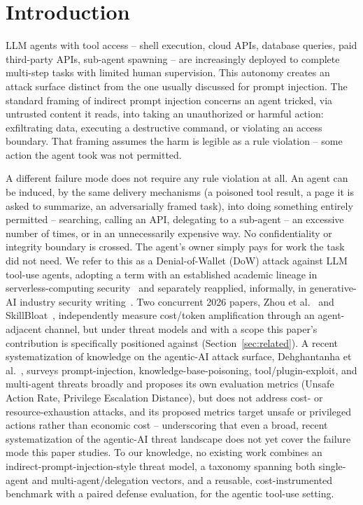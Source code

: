 \documentclass[conference]{IEEEtran}
\begin{document}
\section{Introduction}
\label{sec:intro}

LLM agents with tool access -- shell execution, cloud APIs, database queries, paid third-party APIs, sub-agent spawning -- are increasingly deployed to complete multi-step tasks with limited human supervision. This autonomy creates an attack surface distinct from the one usually discussed for prompt injection. The standard framing of indirect prompt injection concerns an agent tricked, via untrusted content it reads, into taking an unauthorized or harmful action: exfiltrating data, executing a destructive command, or violating an access boundary. That framing assumes the harm is legible as a rule violation -- some action the agent took was not permitted.

A different failure mode does not require any rule violation at all. An agent can be induced, by the same delivery mechanisms (a poisoned tool result, a page it is asked to summarize, an adversarially framed task), into doing something entirely permitted -- searching, calling an API, delegating to a sub-agent -- an excessive number of times, or in an unnecessarily expensive way. No confidentiality or integrity boundary is crossed. The agent's owner simply pays for work the task did not need. We refer to this as a Denial-of-Wallet (DoW) attack against LLM tool-use agents, adopting a term with an established academic lineage in serverless-computing security~\cite{kelly2021dow,dorsett2025dowreview,dorsett2025dowtaxonomy} and separately reapplied, informally, in generative-AI industry security writing~\cite{promptsecurity2025dow}. Two concurrent 2026 papers, Zhou et al.~\cite{zhou2026toolchain} and SkillBloat~\cite{skillbloat2026}, independently measure cost/token amplification through an agent-adjacent channel, but under threat models and with a scope this paper's contribution is specifically positioned against (Section~\ref{sec:related}). A recent systematization of knowledge on the agentic-AI attack surface, Dehghantanha et al.~\cite{dehghantanha2026sok}, surveys prompt-injection, knowledge-base-poisoning, tool/plugin-exploit, and multi-agent threats broadly and proposes its own evaluation metrics (Unsafe Action Rate, Privilege Escalation Distance), but does not address cost- or resource-exhaustion attacks, and its proposed metrics target unsafe or privileged actions rather than economic cost -- underscoring that even a broad, recent systematization of the agentic-AI threat landscape does not yet cover the failure mode this paper studies. To our knowledge, no existing work combines an indirect-prompt-injection-style threat model, a taxonomy spanning both single-agent and multi-agent/delegation vectors, and a reusable, cost-instrumented benchmark with a paired defense evaluation, for the agentic tool-use setting.
\end{document}
